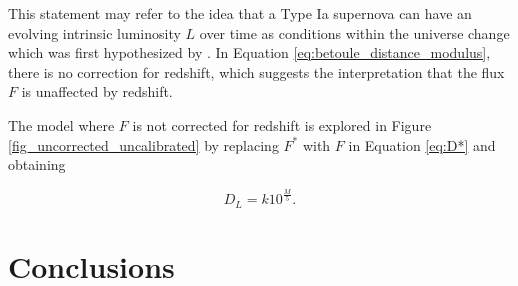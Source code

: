 \documentclass{article}
\begin{document}
This statement may refer to the idea that a Type Ia supernova can have an
evolving intrinsic luminosity $L$ over time as conditions within the universe
change which was first hypothesized by \citet{tinsley1968}. In Equation
\ref{eq:betoule_distance_modulus}, there is no correction for redshift, which
suggests the interpretation that the flux $F$ is unaffected by redshift.

The model where $F$ is not corrected for redshift is explored in Figure
\ref{fig_uncorrected_uncalibrated} by replacing $F^*$ with $F$ in Equation
\ref{eq:D*} and obtaining

\begin{equation}
  D_L = k 10^\frac{M}{5}.
\end{equation}

\section{Conclusions}
\label{sec:conclusions}



\end{document}
